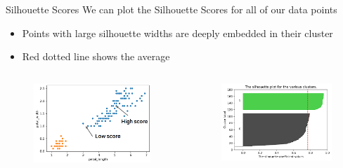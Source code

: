 \documentclass[aspectratio=169]{../latex_main/tntbeamer}  %
\begin{document}
	
	
	
	\begin{frame}{Silhouette Scores}
	    We can plot the Silhouette Scores for all of our data points
	    \begin{itemize}
	        \item Points with large silhouette widths are deeply embedded in their cluster
	        \item Red dotted line shows the average
	    \end{itemize}
	    \begin{columns}
	        \begin{column}{.5\textwidth}
	                \begin{figure}
	                    \centering
	                    \includegraphics[scale=.35]{Bild57}
	                \end{figure}
	        \end{column}
	        
	        
	        \begin{column}{.5\textwidth}
	               \begin{figure}
	                    \centering
	                    \includegraphics[scale=.65]{Bild58}
	                \end{figure}
	        \end{column}
	        
	        
	    \end{columns}
	\end{frame}
	
\end{document}
